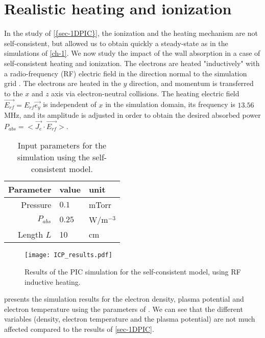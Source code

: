 
\section{Realistic heating and ionization}
  \label{sec-realistic_1D}
  In the study of \cref{{sec-1DPIC}}, the ionization and the heating mechanism are not self-consistent, but allowed us to obtain quickly a steady-state as in the simulations of \cref{ch-1}.
  We now study the impact of the wall absorption in a case of self-consistent heating and ionization.
  The electrons are heated "inductively" with a radio-frequency (RF) electric field in the direction normal to the simulation grid \cite{meige2006a, lucken2018, turner1993}.
  The electrons are heated in the $y$ direction, and momentum is transferred to the $x$ and $z$ axis via electron-neutral collisions.
  The heating electric field $\vec{E_{rf}} = E_{rf} \vec{e_y}$ is independent of $x$ in the simulation domain, its frequency is $13.56$\,MHz, and its amplitude is adjusted in order to obtain the desired absorbed power $P_{abs} = < \vec{J_e} \cdot  \vec{E_{rf}}>$.
  


  \begin{table}[!htb]
    \centering
    \begin{tabular}{@{} r l l @{}}
    \toprule
      Parameter & value & unit \\ \midrule
      Pressure & $0.1$ & mTorr\\
      $P_{abs}$ & $0.25$ & W/m$^{-3}$\\
      Length $L$&10&cm\\
      \bottomrule
    \end{tabular}
    \caption{Input parameters for the simulation using the self-consistent model.}
    \label{tab-PIC2}
  \end{table}

  \begin{figure}[!htbp]
    \center
    \texttt{[image: ICP\_results.pdf]}
    \caption{Results of the PIC simulation for the self-consistent model, using RF inductive heating.}
    \label{fig-icpresults}
  \end{figure}

   presents the simulation results for the electron density, plasma potential and electron temperature using the parameters of .
  We can see that the different variables (density, electron temperature and the plasma potential) are not much affected compared to the results of \cref{sec-1DPIC}.

